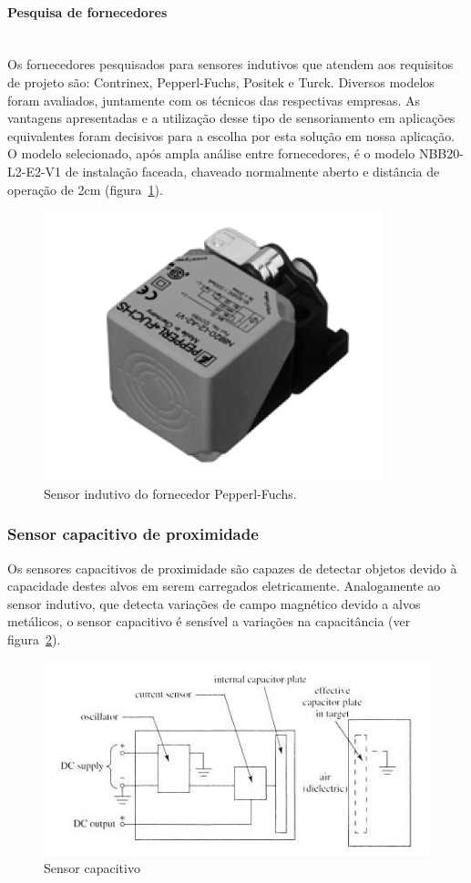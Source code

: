  \paragraph{Pesquisa de fornecedores}\mbox{}\\

Os fornecedores pesquisados para sensores indutivos que atendem aos requisitos de projeto são: Contrinex, Pepperl-Fuchs, Positek e Turck. Diversos modelos foram avaliados, juntamente com os técnicos das respectivas empresas.
As vantagens apresentadas e a utilização desse tipo de sensoriamento em
aplicações equivalentes foram decisivos para a escolha por esta solução em nossa
aplicação. O modelo selecionado, após ampla análise entre fornecedores, é o
modelo NBB20-L2-E2-V1 de instalação faceada, chaveado normalmente aberto e
distância de operação de 2cm (figura~\ref{indutivo_1}).

\begin{figure}[H]
    \centering
    \includegraphics[width=0.4\columnwidth]{figs/indutivo/1.png}
    \caption{Sensor indutivo do fornecedor Pepperl-Fuchs.}
    \label{indutivo_1}
\end{figure}

\subsubsection{Sensor capacitivo de proximidade}
Os sensores capacitivos de proximidade são capazes de detectar objetos devido à capacidade destes alvos em serem carregados eletricamente. Analogamente ao sensor indutivo, que detecta variações de campo magnético devido a alvos metálicos, o sensor capacitivo é sensível a variações na capacitância (ver figura~\ref{capacitivo_1}).

\begin{figure}[H]
    \centering
    \includegraphics[width=0.8\columnwidth]{figs/capacitivo/1.jpg}
    \caption{Sensor capacitivo}
    \label{capacitivo_1}
\end{figure}

